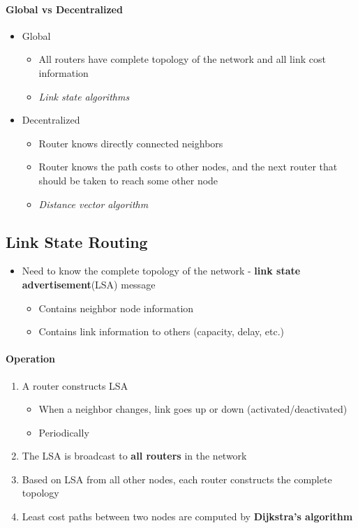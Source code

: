 \paragraph{Global vs Decentralized}
\begin{itemize}
	\item Global
	\begin{itemize}
		\item All routers have complete topology of the network and all link cost information
		\item \textit{Link state algorithms} 
	\end{itemize}
	\item Decentralized
	\begin{itemize}
		\item Router knows directly connected neighbors
		\item Router knows the path costs to other nodes, and the next router that should be taken to reach some other node
		\item \textit{Distance vector algorithm}
	\end{itemize}
\end{itemize}

\subsection{Link State Routing}
\begin{itemize}
	\item Need to know the complete topology of the network - \textbf{link state advertisement}(LSA) message
	\begin{itemize}
		\item Contains neighbor node information
		\item Contains link information to others (capacity, delay, etc.)
	\end{itemize}
\end{itemize}

\paragraph{Operation}
\begin{enumerate}
	\item A router constructs LSA
	\begin{itemize}
		\item When a neighbor changes, link goes up or down (activated/deactivated)
		\item Periodically
	\end{itemize}
	\item The LSA is broadcast to \textbf{all routers} in the network
	\item Based on LSA from all other nodes, each router constructs the complete topology
	\item Least cost paths between two nodes are computed by \textbf{Dijkstra's algorithm}
\end{enumerate}

